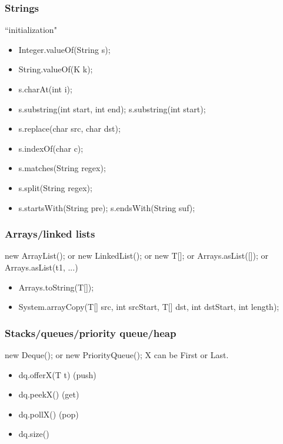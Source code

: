 \documentclass{article}
\begin{document}
\subsubsection{Strings}
``initialization"
\begin{itemize}
    \item Integer.valueOf(String s);
    \item String.valueOf(K k);
    \item s.charAt(int i);
    \item s.substring(int start, int end); s.substring(int start);
    \item s.replace(char src, char dst);
    \item s.indexOf(char c);
    \item s.matches(String regex);
    \item s.split(String regex);
    \item s.startsWith(String pre); s.endsWith(String suf);
\end{itemize}
\subsubsection{Arrays/linked lists}
new ArrayList(); or new LinkedList(); or new T[]; or Arrays.asList([]); or Arrays.asList(t1, ...)
\begin{itemize}
    \item Arrays.toString(T[]);
    \item System.arrayCopy(T[] src, int srcStart, T[] dst, int dstStart, int length);
\end{itemize}
\subsubsection{Stacks/queues/priority queue/heap}
new Deque(); or new PriorityQueue();
X can be First or Last.
\begin{itemize}
    \item dq.offerX(T t) (push)
    \item dq.peekX() (get)
    \item dq.pollX() (pop)
    \item dq.size()
\end{itemize}
\end{document}
